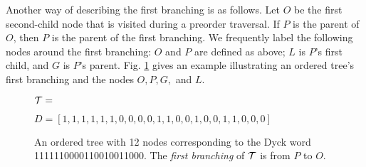 
Another way of describing the first branching is as follows.
Let $O$ be the first second-child node that is visited during a preorder traversal.
If $P$ is the parent of $O$, then $P$ is the parent of the first branching.
We frequently label the following nodes around the first branching: $O$ and $P$ are defined as above; $L$ is $P$'s first child, and $G$ is $P$'s parent. 
Fig. \ref{fig:exampleotree} gives an example illustrating an ordered tree's first branching and the nodes $O,P,G,$ and $L$.







\begin{figure}
    \centering
    $\mathcal{T}=$


    $D=[1, 1, 1, 1, 1, 1, 0, 0, 0, 0, 1, 1, 0, 0, 1, 0, 0, 1, 1, 0, 0, 0]$
    \caption{An ordered tree with 12 nodes corresponding to the Dyck word 1111110000110010011000.  The \emph{first branching} of $\mathcal{T}$ is from $P$ to $O$.}
    \label{fig:exampleotree}
\end{figure}



